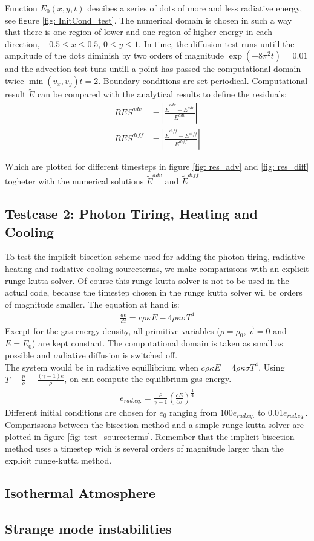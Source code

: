 Function $E_0(x,y,t)$ descibes a series of dots of more and less radiative energy, see figure \ref{fig: InitCond_test}. The numerical domain is chosen in such a way that there is one region of lower and one region of higher energy in each direction, $-0.5 \leq x \leq 0.5$, $0 \leq y \leq 1$. In time, the diffusion test runs untill the amplitude of the dots diminish by two orders of magnitude $\exp(-8 \pi^2 t)  = 0.01$ and the advection test tuns untill a point has passed the computational domain twice $ \min(v_x, v_y) t = 2 $. Boundary conditions are set periodical. Computational result $\tilde{E}$ can be compared with the analytical results to define the residuals:
\begin{align}
RES^{adv} &= \left|\frac{\tilde{E}^{adv} - E^{adv}}{E^{adv}}\right| \\
RES^{diff} &= \left|\frac{\tilde{E}^{diff} - E^{diff}}{E^{diff}}\right| 
\end{align}

Which are plotted for different timesteps in figure \ref{fig: res_adv} and \ref{fig: res_diff} togheter with the numerical solutions $\tilde{E}^{adv}$ and $\tilde{E}^{diff}$

\subsection{Testcase 2: Photon Tiring, Heating and Cooling}
To test the implicit bisection scheme used for adding the photon tiring, radiative heating and radiative cooling sourceterms, we make comparissons with an explicit runge kutta solver. Of course this runge kutta solver is not to be used in the actual code, because the timestep chosen in the runge kutta solver wil be orders of magnitude smaller. The equation at hand is:
\begin{align}
\frac{d e}{dt} = c \rho \kappa E - 4 \rho \kappa \sigma T^4
\end{align}
Except for the gas energy density, all primitive variables ($\rho = \rho_0$, $\vec{v} = 0$ and $E = E_0$) are kept constant. The computational domain is taken as small as possible and radiative diffusion is switched off. \\

The system would be in radiative equillibrium when $c \rho \kappa E = 4 \rho \kappa \sigma T^4$. Using $T =  \frac{p}{\rho}= \frac{(\gamma - 1)e}{\rho}$, on can compute the equilibrium gas energy.
\begin{align}
e_{rad. eq.} = \frac{\rho}{\gamma - 1} \left( \frac{c E}{4 \sigma} \right)^\frac{1}{4}
\end{align}
Different initial conditions are chosen for $e_0$ ranging from $100 e_{rad. eq.}$ to $0.01 e_{rad. eq.}$. Comparissons between the bisection method and a simple runge-kutta solver are plotted in figure \ref{fig: test_sourceterms}. Remember that the implicit bisection method uses a timestep wich is several orders of magnitude larger than the explicit runge-kutta method.

\subsection{Isothermal Atmosphere}
\subsection{Strange mode instabilities}
